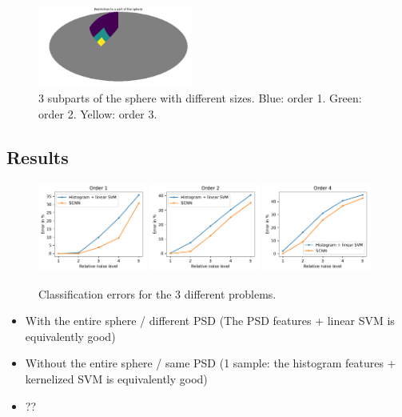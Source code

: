 \documentclass[preprint,12pt,authoryear]{elsarticle}
\newcommand{\assign}[1]{{\color[rgb]{.8,.5,.8}{Assigned: #1 }}}
\begin{document}
\begin{figure}[!ht]
\centering
\includegraphics[width=0.45\textwidth]{figures/part_sphere.pdf}
\caption{3 subparts of the sphere with different sizes. Blue: order 1. Green: order 2. Yellow: order 3.}
\label{fig:subpart_sphere}
\end{figure}

\subsection{Results}

\begin{figure}[!ht]
\centering
\includegraphics[width=0.32\textwidth]{figures/result_order1.pdf}
\includegraphics[width=0.32\textwidth]{figures/result_order2.pdf}
\includegraphics[width=0.32\textwidth]{figures/result_order4.pdf}
\caption{Classification errors for the 3 different problems.}
\label{fig:results}
\end{figure}

\assign{Nathanaël, Tomek}

\begin{itemize}
	\item With the entire sphere / different PSD (The PSD features + linear SVM is equivalently good)
	\item Without the entire sphere / same PSD (1 sample: the histogram features + kernelized SVM is equivalently good)
	\item ??
\end{itemize}
\end{document}
